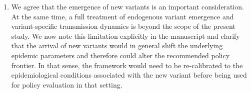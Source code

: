 \documentclass[letterpaper,twoside,11pt]{reviewresponse}
\begin{document}
\begin{enumerate}
The reason is that two forces operate simultaneously. A longer horizon increases the value of early containment because infections prevented today reduce downstream transmission over many subsequent months. However, the economic and social costs of restrictive interventions also accumulate over time. Given the transmissibility of COVID-19 and the limited effectiveness of non-pharmaceutical interventions in completely eliminating transmission, the model generally finds it preferable to suppress the epidemic early and then gradually relax restrictions rather than maintain the strictest intervention indefinitely.

\item We agree that the emergence of new variants is an important consideration. At the same time, a full treatment of endogenous variant emergence and variant-specific transmission dynamics is beyond the scope of the present study. We now note this limitation explicitly in the manuscript and clarify that the arrival of new variants would in general shift the underlying epidemic parameters and therefore could alter the recommended policy frontier. In that sense, the framework would need to be re-calibrated to the epidemiological conditions associated with the new variant before being used for policy evaluation in that setting.
\end{enumerate}



\end{document}
